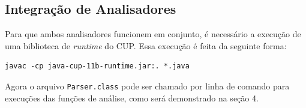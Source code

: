 \subsection{Integração de Analisadores}

Para que ambos analisadores funcionem em conjunto, é necessário a execução de uma biblioteca de \textit{runtime} do CUP. Essa execução é feita da seguinte forma:

\begin{Verbatim}[frame=single]
javac -cp java-cup-11b-runtime.jar:. *.java
\end{Verbatim}

Agora o arquivo \texttt{Parser.class} pode ser chamado por linha de comando para execuções das funções de análise, como será demonstrado na seção 4.